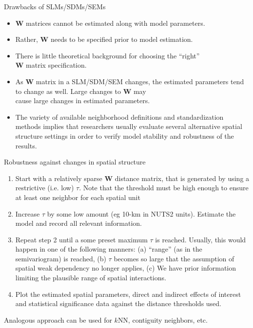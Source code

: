 \documentclass{beamer}
\begin{document}
\begin{frame}{Drawbacks of SLMs/SDMs/SEMs}
\begin{itemize}
    \item $\bm{W}$ matrices cannot be estimated along with model parameters. 
    \medskip
    \item Rather, $\bm{W}$ needs to be specified prior to model estimation. 
    \medskip
    \item There is little theoretical background for choosing the ``right'' \\$\bm{W}$ matrix specification. 
    \medskip
    \item As $\bm{W}$ matrix in a SLM/SDM/SEM changes, the estimated parameters tend to change as well. Large changes to $\bm{W}$ may \\cause large changes in estimated parameters.
    \medskip
    \item The variety of available neighborhood definitions and standardization methods implies that researchers usually evaluate several alternative spatial structure settings in order to verify model stability and robustness of the results. 
\end{itemize}
\end{frame}
\begin{frame}{Robustness against changes in spatial structure}
\begin{enumerate}
\item Start with a relatively sparse $\bm{W}$ distance matrix, that is generated by using a restrictive (i.e. low) $\tau$. Note that the threshold must be high enough to ensure at least one neighbor for each spatial unit
\medskip
\item Increase $\tau$ by some low amount (eg 10-km in NUTS2 units). Estimate the model and record all relevant information. 
\medskip
\item Repeat step 2 until a some preset maximum $\tau$ is reached. Usually, this would happen in one of the following manners: (a) ``range'' (as in the semivariogram) is reached, (b) $\tau$ becomes so large that the assumption of spatial weak dependency no longer applies, (c) We have prior information limiting the plausible range of spatial interactions.
\medskip
\item Plot the estimated spatial parameters, direct and indirect effects of interest and statistical significance data  against the distance thresholds used.
\end{enumerate}
Analogous approach can be used for $k$NN, contiguity neighbors, etc.
\end{frame}
\end{document}
